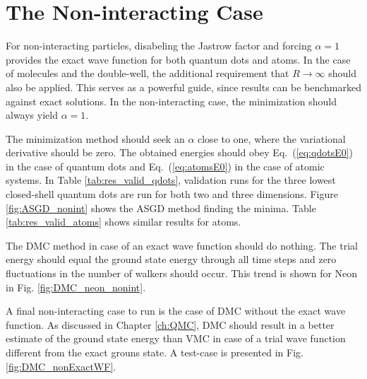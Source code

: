 \section{The Non-interacting Case}

For non-interacting particles, disabeling the Jastrow factor and forcing $\alpha=1$ provides the exact wave function for both quantum dots and atoms. In the case of molecules and the double-well, the additional requirement that $R\to\infty$ should also be applied. This serves as a powerful guide, since results can be benchmarked against exact solutions. In the non-interacting case, the minimization should always yield $\alpha=1$. 

The minimization method should seek an $\alpha$ close to one, where the variational derivative should be zero. The obtained energies should obey Eq.~(\ref{eq:qdotsE0}) in the case of quantum dots and Eq.~(\ref{eq:atomsE0}) in the case of atomic systems. In Table \ref{tab:res_valid_qdots}, validation runs for the three lowest closed-shell quantum dots are run for both two and three dimensions. Figure \ref{fig:ASGD_nonint} shows the ASGD method finding the minima. Table \ref{tab:res_valid_atoms} shows similar results for atoms.

The DMC method in case of an exact wave function should do nothing. The trial energy should equal the ground state energy through all time steps and zero fluctuations in the number of walkers should occur. This trend is shown for Neon in Fig. \ref{fig:DMC_neon_nonint}.

A final non-interacting case to run is the case of DMC without the exact wave function. As discussed in Chapter \ref{ch:QMC}, DMC should result in a better estimate of the ground state energy than VMC in case of a trial wave function different from the exact grouns state. A test-case is presented in Fig. \ref{fig:DMC_nonExactWF}.

